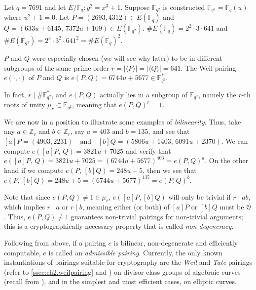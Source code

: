 



\begin{example}
	Let $q = 7691$ and let $E/\mathbb{F}_q : y^2 = x^3 + 1$. Suppose $\mathbb{F}_{q^2}$ is constructed $\mathbb{F}_{q^2} = \mathbb{F}_q(u)$ where $u^2 + 1 = 0$. Let $P = (2693, 4312) \in E(\mathbb{F}_q)$ and $Q = (633u + 6145,\, 7372u + 109) \in E(\mathbb{F}_{q^2})$. $\#E(\mathbb{F}_q) = 2^2 \cdot 3 \cdot 641$ and $\#E(\mathbb{F}_{q^2}) = 2^4 \cdot 3^2 \cdot 641^2 = \#E(\mathbb{F}_q)^2$.
	
	$P$ and $Q$ were especially chosen (we will see why later) to be in different subgroups of the same prime order $r = |\langle P \rangle| = |\langle Q \rangle| = 641$. The Weil pairing $e(\cdot, \cdot)$ of $P$ and $Q$ is $e(P, Q) = 6744u + 5677 \in \mathbb{F}_{q^2}^*.$
	
	In fact, $r \mid \#\mathbb{F}_{q^2}^*$, and $e(P, Q)$ actually lies in a subgroup of $\mathbb{F}_{q^2}$, namely the $r$-th roots of unity $\mu_r \subset \mathbb{F}_{q^2}$, meaning that $e(P, Q)^r = 1$. 
	
	We are now in a position to illustrate some examples of \textit{bilinearity}. Thus, take any $a \in \mathbb{Z}_r$ and $b \in \mathbb{Z}_r$, say $a = 403$ and $b = 135$, and see that
	$[a]P = (4903, 2231) \quad \text{and} \quad [b]Q = (5806u + 1403,\, 6091u + 2370).$ We can compute $e([a]P,\, Q) = 3821u + 7025$ and verify that $e([a]P,\, Q) = 3821u + 7025 = (6744u + 5677)^{403} = e(P, Q)^a$.  On the other hand if we compute $e(P,\, [b]Q) = 248u + 5$, then we see that $e(P,\, [b]Q) = 248u + 5 = (6744u + 5677)^{135} = e(P, Q)^b$.
		
	Note that since $e(P, Q) \neq 1 \in \mu_r$, $e([a]P, [b]Q)$ will only be trivial if $r \mid ab$, which implies $r \mid a$ or $r \mid b$, meaning either (or both) of $[a]P$ or $[b]Q$ must be $\EuScript{O}$. Thus, $e(P, Q) \neq 1$ guarantees non-trivial pairings for non-trivial arguments; this is a cryptographically necessary property that is called \textit{non-degeneracy}.
	
	\label{example:pairingexample}
\end{example}

Following from  above, if a pairing $e$ is bilinear, non-degenerate and efficiently computable, $e$ is called an \emph{admissible pairing}. Currently, the only known instantiations of pairings suitable for cryptography are the \textit{Weil} and \textit{Tate} pairings (refer to \ref{ssec:ch2.weilpairing} and ) on divisor class groups of algebraic curves (recall from ), and in
the simplest and most efficient cases, on elliptic curves. 

